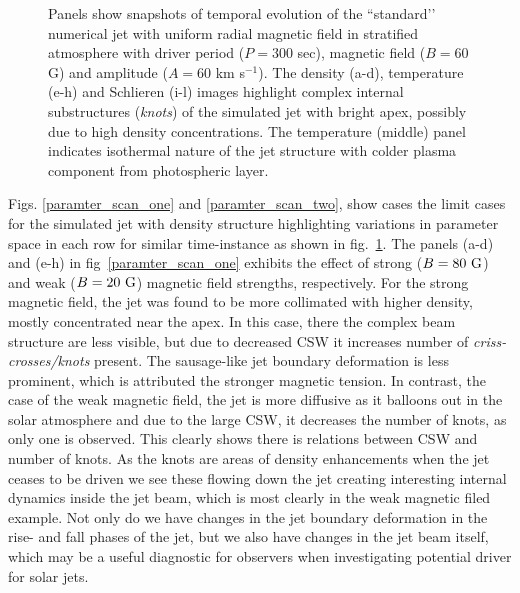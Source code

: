 \documentclass[12pt]{ociamthesis}
\newcommand{\np}{\\ \\}
\begin{document}
\begin{figure}
\captionsetup[subfigure]{labelformat=empty}
\centering
{}
\caption{Panels show snapshots of temporal evolution of the ``standard’’ numerical jet with uniform radial magnetic field in stratified atmosphere with driver period ($P = 300$ sec), magnetic field ($B = 60$ G) and amplitude ($A = 60$ km s$^{-1}$). The density (a-d), temperature (e-h) and Schlieren (i-l) images highlight complex internal substructures (\textit{knots}) of the simulated jet with bright apex, possibly due to high density concentrations. The temperature (middle) panel indicates isothermal nature of the jet structure with colder plasma component from photospheric layer. }
\label{standard_jet}
\end{figure}
%
Figs. \ref{paramter_scan_one} and \ref{paramter_scan_two}, show cases the limit cases for the simulated jet with density structure highlighting variations in parameter space in each row for similar time-instance as shown in fig.~\ref{standard_jet}. The panels (a-d) and (e-h) in fig~\ref{paramter_scan_one} exhibits the effect of strong ($B = 80~\rm{G}$) and weak ($B = 20~\rm{G}$) magnetic field strengths, respectively. For the strong magnetic field, the jet was found to be more collimated with higher density, mostly concentrated near the apex. In this case, there the complex beam structure are less visible, but due to decreased CSW it increases number of \textit{criss-crosses/knots} present. The sausage-like jet boundary deformation is less prominent, which is attributed the stronger magnetic tension. In contrast, the case of the weak magnetic field, the jet is more diffusive as it balloons out in the solar atmosphere and due to the large CSW, it decreases the number of knots, as only one is observed. This clearly shows there is relations between CSW and number of knots. As the knots are areas of density enhancements when the jet ceases to be driven we see these flowing down the jet creating interesting internal dynamics inside the jet beam, which is most clearly in the weak magnetic filed example. Not only do we have changes in the jet boundary deformation in the rise- and fall phases of the jet, but we also have changes in the jet beam itself, which may be a useful diagnostic for observers when investigating potential driver for solar jets. \np     
%
\end{document}
